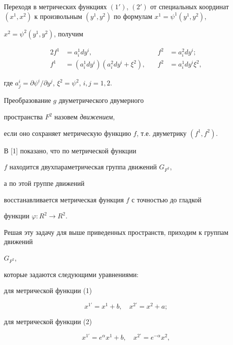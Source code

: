 Переходя в метрических функциях $(1')$, $(2')$ от специальных координат $(x^1,


x^2)$ к произвольным $(y^1,y^2)$ по формулам $x^1=\psi^1(y^1,y^2)$,


$x^2=\psi^2(y^1,y^2)$, получим


\begin{alignat*}{2}


f^1&=a_i^1dy^i, &\quad f^2&=a_i^2dy^i;\\


%


f^1&=(a_i^1dy^i)(a_i^2dy^i+\xi^2), &\quad


f^2&=a_i^1dy^i\xi^2,


\end{alignat*}


где $a^i_j=\partial \psi^i/\partial y^j$, $\xi^2=\psi^2$, $i,j=1,2$.





Преобразование $g$ двуметрического двумерного


пространства $F^2$ назовем {\it движением},


если оно сохраняет метрическую функцию $f$, т.е. двуметрику $(f^1,f^2)$.


В [1] показано, что по метрической функции


$f$ находится двухпараметрическая группа движений $G_{F^2}$, 


а по этой группе движений


восстанавливается метрическая функция $f$ с точностью до гладкой


функции $\varphi: R^2 \to R^2$.


Решая эту задачу для выше приведенных пространств, приходим к группам движений


$G_{F^2}$,


которые задаются следующими уравнениями:





для метрической функции (1)


$$


x^{1 \prime}=x^1+b,\quad x^{2 \prime}=x^2+a;


$$





для метрической функции (2)


\begin{equation}


x^{1 \prime}=e^{\alpha} x^1+b,\quad x^{2 \prime}=e^{-\alpha} x^2,


\end{equation}


